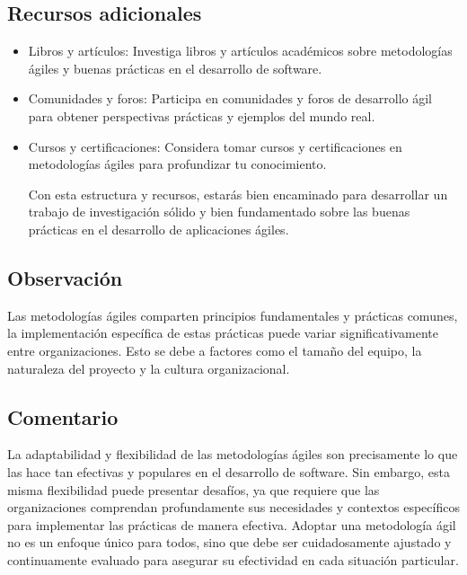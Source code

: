\documentclass[12pt]{article}
\begin{document}
\subsection*{Recursos adicionales}
\begin{itemize}
    \item Libros y artículos: Investiga libros y artículos académicos sobre metodologías ágiles y buenas prácticas en el desarrollo de software.
    \item Comunidades y foros: Participa en comunidades y foros de desarrollo ágil para obtener perspectivas prácticas y ejemplos del mundo real.
    \item Cursos y certificaciones: Considera tomar cursos y certificaciones en metodologías ágiles para profundizar tu conocimiento.

Con esta estructura y recursos, estarás bien encaminado para desarrollar un trabajo de investigación sólido y bien fundamentado sobre las buenas prácticas en el desarrollo de aplicaciones ágiles.
\end{itemize}

\subsection*{Observación}
Las metodologías ágiles comparten principios fundamentales y prácticas comunes, la implementación específica de estas prácticas puede variar significativamente entre organizaciones. Esto se debe a factores como el tamaño del equipo, la naturaleza del proyecto y la cultura organizacional.

\subsection*{Comentario}
La adaptabilidad y flexibilidad de las metodologías ágiles son precisamente lo que las hace tan efectivas y populares en el desarrollo de software. Sin embargo, esta misma flexibilidad puede presentar desafíos, ya que requiere que las organizaciones comprendan profundamente sus necesidades y contextos específicos para implementar las prácticas de manera efectiva. Adoptar una metodología ágil no es un enfoque único para todos, sino que debe ser cuidadosamente ajustado y continuamente evaluado para asegurar su efectividad en cada situación particular.
\end{document}
